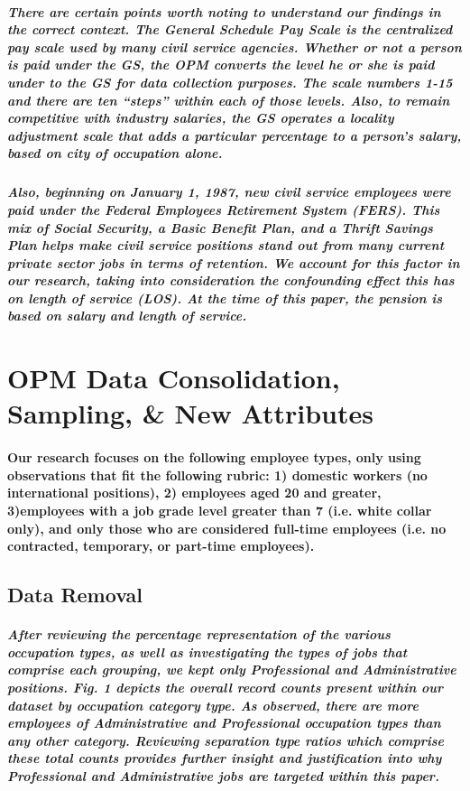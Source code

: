 \documentclass{article}
\begin{document}
\subparagraph{There are certain points worth noting to understand our findings in the correct context.  The General Schedule Pay Scale is the centralized pay scale used by many civil service agencies. Whether or not a person is paid under the GS, the OPM converts the level he or she is paid under to the GS for data collection purposes. The scale numbers 1-15 and there are ten “steps” within each of those levels.  Also, to remain competitive with industry salaries, the GS operates a locality adjustment scale that adds a particular percentage to a person’s salary, based on city of occupation alone.}

\subparagraph{ Also, beginning on January 1, 1987,  new civil service employees were paid under the Federal Employees Retirement System (FERS). This mix of Social Security, a Basic Benefit Plan, and a Thrift Savings Plan helps make civil service positions stand out from many current private sector jobs in terms of retention. We account for this factor in our research, taking into consideration the confounding effect this has on length of service (LOS). At the time of this paper, the pension is based on salary and length of service.}


\section{OPM Data Consolidation, Sampling, \& New Attributes}

\paragraph{Our research focuses on the following employee types, only using observations that fit the following rubric: 1) domestic workers (no international positions), 2) employees aged 20 and greater, 3)employees with a job grade level greater than 7 (i.e. white collar only), and only those who are considered full-time employees (i.e. no contracted, temporary, or part-time employees).}  
  
 
\subsection{Data Removal}

\subparagraph{After reviewing the percentage representation of the various occupation types, as well as investigating the types of jobs that comprise each grouping, we kept only Professional and Administrative positions. Fig. 1 depicts the overall record counts present within our dataset by occupation category type. As observed, there are more employees of Administrative and Professional occupation types than any other category. Reviewing separation type ratios which comprise these total counts provides further insight and justification into why Professional and Administrative jobs are targeted within this paper.}
 
\end{document}
